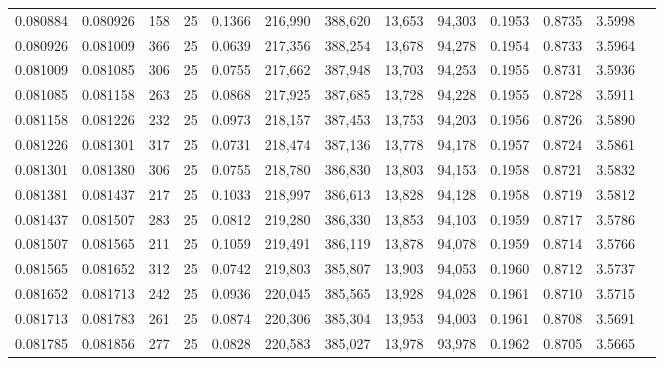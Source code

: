 \begin{tabular}{rrrrrrrrrrrrr}
0.080884 & 0.080926 &   158 &  25 &                                     0.1366 & 216,990 & 388,620 &  13,653 &  94,303 & 0.1953 & 0.8735 & 3.5998 \\
0.080926 & 0.081009 &   366 &  25 &                                     0.0639 & 217,356 & 388,254 &  13,678 &  94,278 & 0.1954 & 0.8733 & 3.5964 \\
0.081009 & 0.081085 &   306 &  25 &                                     0.0755 & 217,662 & 387,948 &  13,703 &  94,253 & 0.1955 & 0.8731 & 3.5936 \\
0.081085 & 0.081158 &   263 &  25 &                                     0.0868 & 217,925 & 387,685 &  13,728 &  94,228 & 0.1955 & 0.8728 & 3.5911 \\
0.081158 & 0.081226 &   232 &  25 &                                     0.0973 & 218,157 & 387,453 &  13,753 &  94,203 & 0.1956 & 0.8726 & 3.5890 \\
0.081226 & 0.081301 &   317 &  25 &                                     0.0731 & 218,474 & 387,136 &  13,778 &  94,178 & 0.1957 & 0.8724 & 3.5861 \\
0.081301 & 0.081380 &   306 &  25 &                                     0.0755 & 218,780 & 386,830 &  13,803 &  94,153 & 0.1958 & 0.8721 & 3.5832 \\
0.081381 & 0.081437 &   217 &  25 &                                     0.1033 & 218,997 & 386,613 &  13,828 &  94,128 & 0.1958 & 0.8719 & 3.5812 \\
0.081437 & 0.081507 &   283 &  25 &                                     0.0812 & 219,280 & 386,330 &  13,853 &  94,103 & 0.1959 & 0.8717 & 3.5786 \\
0.081507 & 0.081565 &   211 &  25 &                                     0.1059 & 219,491 & 386,119 &  13,878 &  94,078 & 0.1959 & 0.8714 & 3.5766 \\
0.081565 & 0.081652 &   312 &  25 &                                     0.0742 & 219,803 & 385,807 &  13,903 &  94,053 & 0.1960 & 0.8712 & 3.5737 \\
0.081652 & 0.081713 &   242 &  25 &                                     0.0936 & 220,045 & 385,565 &  13,928 &  94,028 & 0.1961 & 0.8710 & 3.5715 \\
0.081713 & 0.081783 &   261 &  25 &                                     0.0874 & 220,306 & 385,304 &  13,953 &  94,003 & 0.1961 & 0.8708 & 3.5691 \\
0.081785 & 0.081856 &   277 &  25 &                                     0.0828 & 220,583 & 385,027 &  13,978 &  93,978 & 0.1962 & 0.8705 & 3.5665 \\

\end{tabular}
